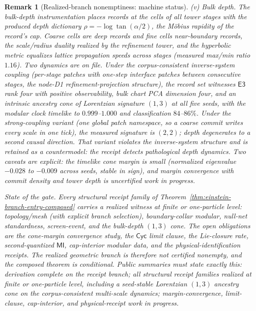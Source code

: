\documentclass[11pt]{article}
\newtheorem{remark}[theorem]{Remark}
\begin{document}
\begin{remark}[Realized-branch nonemptiness: machine status]
(v) \emph{Bulk depth.} The bulk-depth instrumentation
places records at the
cells of all tower stages with the produced depth dictionary
\(\rho=-\log\tan(\alpha/2)\), the M\"obius rapidity of the record's cap.
Coarse cells are deep records and fine cells near-boundary records, the
scale/radius duality realized by the refinement tower, and the hyperbolic
metric equalizes lattice propagation speeds across stages (measured
max/min ratio \(1.16\)). Two dynamics are on file. Under the
corpus-consistent inverse-system coupling (per-stage patches with one-step
interface patches between consecutive stages, the node-D1
refinement-projection structure), the record set witnesses
\(\mathsf{E3}\) rank four with positive observability, bulk chart PCA
dimension four, and an intrinsic ancestry cone of Lorentzian signature
\((1,3)\) at all five seeds, with the modular clock timelike to
\(0.999\)--\(1.000\) and classification \(84\)--\(86\%\). Under the
strong-coupling variant (one global patch namespace, so a coarse commit
writes every scale in one tick), the measured signature is \((2,2)\);
depth degenerates to a second causal direction. That variant violates the
inverse-system structure and is retained as a countermodel: the receipt
detects pathological depth dynamics. Two caveats are explicit: the
timelike cone margin is small (normalized eigenvalue \(-0.028\) to
\(-0.009\) across seeds, stable in sign), and margin convergence with
commit density and tower depth is uncertified work in progress.

\emph{State of the gate.} Every structural receipt family of
Theorem~\ref{thm:einstein-branch-entry-composed} carries a realized
witness at finite or one-particle level: topology/mesh (with explicit
branch selection), boundary-collar modular, null-net standardness,
screen-event, and the bulk-depth \((1,3)\) cone. The open obligations are
the cone-margin convergence study, the \(\mathsf{Cyc}\) limit clause, the
Lie-closure rate, second-quantized \(\mathsf{MI}\), cap-interior modular
data, and the physical-identification receipts. The realized geometric
branch is therefore not certified nonempty, and the composed theorem is
conditional. Public summaries must state exactly this: derivation complete
on the receipt branch; all structural receipt families realized at finite
or one-particle level, including a seed-stable Lorentzian \((1,3)\)
ancestry cone on the corpus-consistent multi-scale dynamics;
margin-convergence, limit-clause, cap-interior, and physical-receipt work
in progress.
\end{remark}
\end{document}
